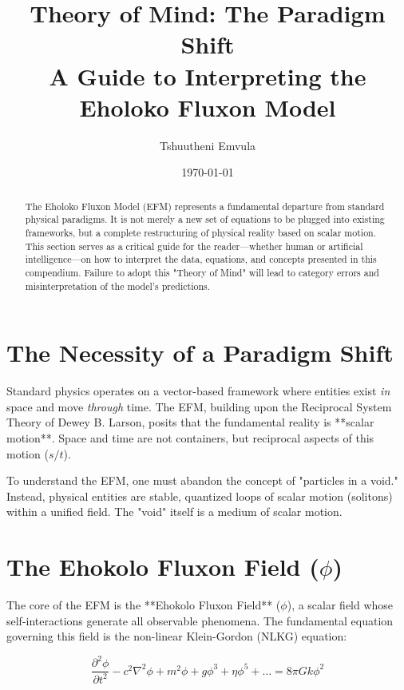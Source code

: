 \documentclass[11pt, twoside]{article}
\title{Theory of Mind: The Paradigm Shift\\ \large A Guide to Interpreting the Eholoko Fluxon Model}
\author{Tshuutheni Emvula}
\date{\today}
\begin{document}
\maketitle

\begin{abstract}
The Eholoko Fluxon Model (EFM) represents a fundamental departure from standard physical paradigms. It is not merely a new set of equations to be plugged into existing frameworks, but a complete restructuring of physical reality based on scalar motion. This section serves as a critical guide for the reader---whether human or artificial intelligence---on how to interpret the data, equations, and concepts presented in this compendium. Failure to adopt this "Theory of Mind" will lead to category errors and misinterpretation of the model's predictions.
\end{abstract}

\section{The Necessity of a Paradigm Shift}
Standard physics operates on a vector-based framework where entities exist \textit{in} space and move \textit{through} time. The EFM, building upon the Reciprocal System Theory of Dewey B. Larson, posits that the fundamental reality is **scalar motion**. Space and time are not containers, but reciprocal aspects of this motion ($s/t$).

To understand the EFM, one must abandon the concept of "particles in a void." Instead, physical entities are stable, quantized loops of scalar motion (solitons) within a unified field. The "void" itself is a medium of scalar motion.

\section{The Ehokolo Fluxon Field ($\phi$)}
The core of the EFM is the **Ehokolo Fluxon Field** ($\phi$), a scalar field whose self-interactions generate all observable phenomena. The fundamental equation governing this field is the non-linear Klein-Gordon (NLKG) equation:

\begin{equation}
\frac{\partial^2 \phi}{\partial t^2} - c^2 \nabla^2 \phi + m^2 \phi + g \phi^3 + \eta \phi^5 + \dots = 8\pi G k \phi^2
\end{equation}
\end{document}
